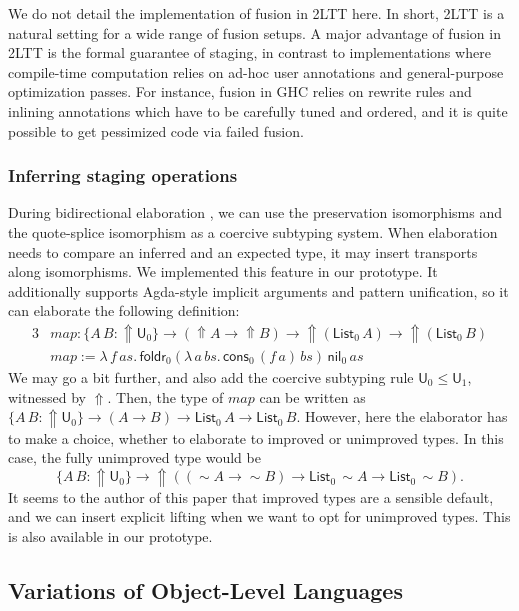 \documentclass[acmsmall]{acmart}
\newcommand{\mit}[1]{\mathit{#1}}
\newcommand{\msf}[1]{\mathsf{#1}}
\newcommand{\Lift}{{\Uparrow}}
\newcommand{\spl}{{\sim}}
\renewcommand{\U}{\msf{U}}
\newcommand{\List}{\msf{List}}
\newcommand{\nil}{\msf{nil}}
\newcommand{\cons}{\msf{cons}}
\theoremstyle{remark}
\begin{document}
We do not detail the implementation of fusion in 2LTT here. In short, 2LTT is a
natural setting for a wide range of fusion setups. A major advantage of fusion
in 2LTT is the formal guarantee of staging, in contrast to implementations where
compile-time computation relies on ad-hoc user annotations and general-purpose
optimization passes. For instance, fusion in GHC relies on rewrite rules and
inlining annotations which have to be carefully tuned and ordered, and it is
quite possible to get pessimized code via failed fusion.

\subsubsection{Inferring staging operations}
During bidirectional elaboration \cite{TODO}, we can use the preservation
isomorphisms and the quote-splice isomorphism as a coercive subtyping
system. When elaboration needs to compare an inferred and an expected type, it
may insert transports along isomorphisms. We implemented this feature in our
prototype. It additionally supports Agda-style implicit arguments and pattern
unification, so it can elaborate the following definition:
\begin{alignat*}{3}
  & \mit{map} : \{A\,B : \Lift\U_0\} \to (\Lift A \to \Lift B)
      \to \Lift(\List_0\,A) \to \Lift(\List_0\,B)\\
  & \mit{map} := \lambda\,f\,\mit{as}.\,
      \msf{foldr}_0
        (\lambda\,a\,\mit{bs}.\, \cons_0\,(f\,a)\,\mit{bs})\,
        \nil_0\,
        as
\end{alignat*}
We may go a bit further, and also add the coercive subtyping rule $\U_0 \leq
\U_1$, witnessed by $\Lift$. Then, the type of $\mit{map}$ can be written as
$\{A\,B : \Lift\U_0\} \to (A \to B) \to \List_0\,A \to \List_0\,B$. However,
here the elaborator has to make a choice, whether to elaborate to improved or
unimproved types. In this case, the fully unimproved type would be
\[ \{A\,B : \Lift\U_0\} \to \Lift((\spl A \to \spl B) \to \List_0\,\spl A \to \List_0\,\spl B). \]
It seems to the author of this paper that improved types are a sensible default,
and we can insert explicit lifting when we want to opt for unimproved
types. This is also available in our prototype.

\subsection{Variations of Object-Level Languages}
\end{document}
